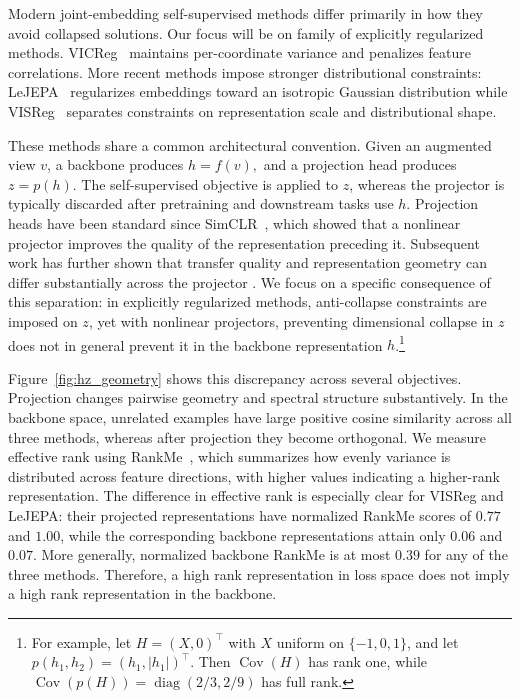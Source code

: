 \documentclass{article} %
\theoremstyle{remark}
\begin{document}
Modern joint-embedding self-supervised methods differ primarily in how they avoid collapsed solutions. Our focus will be on family of explicitly regularized methods. VICReg~\citep{vicreg2022} maintains per-coordinate variance and penalizes feature correlations. More recent methods impose stronger distributional constraints: LeJEPA~\citep{lejepa2025} regularizes embeddings toward an isotropic Gaussian distribution while VISReg~\citep{visreg2026} separates constraints on representation scale and distributional shape.

These methods share a common architectural convention. Given an augmented view $v$, a backbone produces
   $ h = f(v),$
and a projection head produces
$ z = p(h).$
The self-supervised objective is applied to $z$, whereas the projector is
typically discarded after pretraining and downstream tasks use $h$. Projection
heads have been standard since SimCLR~\citep{simclr2020}, which showed that a nonlinear projector improves the quality of the representation preceding it. Subsequent work has further shown that transfer quality and representation geometry can differ substantially across the projector \citep{guillotinebordes2023,xue2024,ouyang2025}. We focus on a specific consequence of this separation: in explicitly regularized
methods, anti-collapse constraints are imposed on $z$, yet with nonlinear
projectors, preventing dimensional collapse in $z$ does not in general prevent it in the backbone representation $h$.\footnote{For example, let $H=(X,0)^\top$ with $X$ uniform on $\{-1,0,1\}$, and let $p(h_1,h_2)=(h_1,|h_1|)^\top$. Then $\operatorname{Cov}(H)$ has rank one, while
$\operatorname{Cov}(p(H))=\operatorname{diag}(2/3,2/9)$ has full rank.}

Figure~\ref{fig:hz_geometry} shows this discrepancy across several
objectives. Projection changes pairwise geometry and
spectral structure substantively. In the backbone space, unrelated examples have large positive cosine similarity across all three methods, whereas after projection they become orthogonal. We measure effective rank using RankMe~\citep{rankme2023}, which summarizes how evenly variance is distributed across feature directions, with higher values indicating a higher-rank representation. The difference in effective rank is especially clear for VISReg and LeJEPA: their projected
representations have normalized RankMe scores of $0.77$ and $1.00$, while the
corresponding backbone representations attain only $0.06$ and $0.07$.
More generally, normalized backbone RankMe is at most $0.39$ for any of the three methods. Therefore, a high rank representation in loss space does not imply a high rank representation in the backbone.
\end{document}
